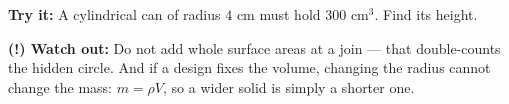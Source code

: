 \documentclass[12pt]{article}
\begin{document}
\begin{tryitbox}
\textbf{Try it:} \quad A cylindrical can of radius $4$ cm must hold $300$ cm$^3$. Find its
height.\\[2pt]
\end{tryitbox}

\begin{watchoutbox}
\textbf{(!) Watch out:} Do not add whole surface areas at a join --- that double-counts the
hidden circle. And if a design fixes the volume, changing the radius cannot change the mass:
$m = \rho V$, so a wider solid is simply a shorter one.
\end{watchoutbox}
\end{document}
